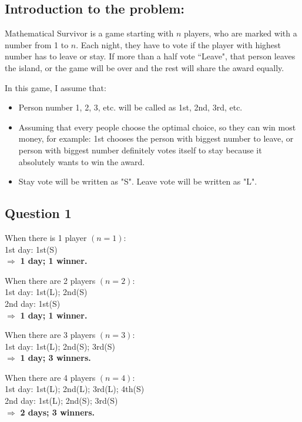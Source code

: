 \documentclass[12pt]{article}
\begin{document}
\subsection*{Introduction to the problem:}

\noindent Mathematical Survivor is a game starting with $n$ players, who are marked with a number from 1 to $n$. Each night, they have to vote if the player with highest number has to leave or stay. If more than a half vote ``Leave", that person leaves the island, or the game will be over and the rest will share the award equally.

\noindent In this game, I assume that:
\begin{itemize}
    \item Person number 1, 2, 3, etc. will be called as 1st, 2nd, 3rd, etc.
    \item Assuming that every people choose the optimal choice, so they can win most money, for example: 1st chooses the person with biggest number to leave, or person with biggest number definitely votes itself to stay because it absolutely wants to win the award.
    \item Stay vote will be written as "S". Leave vote will be written as "L".
\end{itemize}

\subsection*{Question 1}

\noindent When there is 1 player $\displaystyle (n=1)$:\\
\noindent 1st day: 1st(S) \\
$\Longrightarrow$ \textbf{1 day; 1 winner.}\par
    
\noindent When there are 2 players $\displaystyle (n=2)$:\\
\noindent 1st day: 1st(L); 2nd(S) \\
\noindent 2nd day: 1st(S) \\
$\Longrightarrow$ \textbf{1 day; 1 winner.}\par
    
\noindent When there are 3 players $\displaystyle (n=3)$:\\
\noindent 1st day: 1st(L); 2nd(S); 3rd(S) \\
$\Longrightarrow$ \textbf{1 day; 3 winners.}\par
    
\noindent When there are 4 players $\displaystyle (n=4)$:\\
\noindent 1st day: 1st(L); 2nd(L); 3rd(L); 4th(S) \\
\noindent 2nd day: 1st(L); 2nd(S); 3rd(S) \\
$\Longrightarrow$ \textbf{2 days; 3 winners.}\par
    
\end{document}

